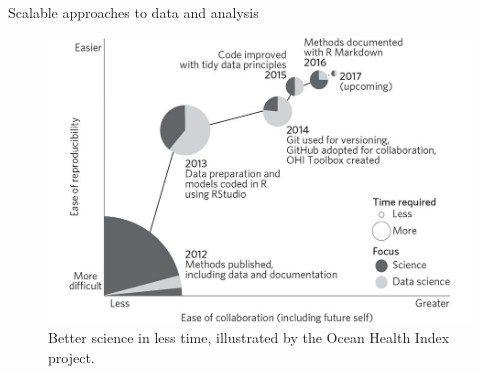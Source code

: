 \documentclass[aspectratio=169, 11pt]{beamer} %
\begin{document}
\begin{frame}{Scalable approaches to data and analysis}
  \begin{figure}[H]
    \centering
        \includegraphics[height=.7\textheight]{figures/Ocean-Health-Index.jpg}
        \caption{Better science in less time, illustrated by the Ocean Health Index project. \cite{Stewart_Lowndes2017-lj}}
        \label{fig:stewart_lowndes}
  \end{figure}
\end{frame}
\end{document}

